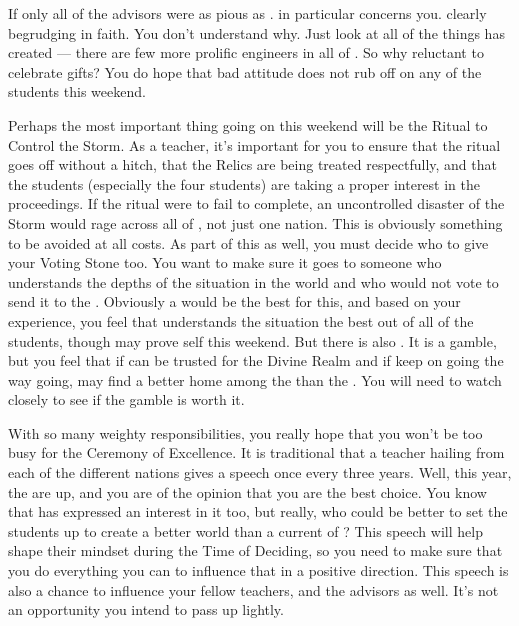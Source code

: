 \documentclass[char]{GL2020}
\begin{document}
If only all of the advisors were as pious as \cEbbPriest{}. \cBunker{\full} in particular concerns you. \cBunker{\They} \cBunker{\are} clearly begrudging in \cBunker{\their} faith. You don't understand why. Just look at all of the things \cBunker{} has created — there are few more prolific engineers in all of \pEarth{}. So why \cBunker{\are} \cBunker{\they} reluctant to celebrate \cBunker{\their} gifts? You do hope that \cBunker{\their} bad attitude does not rub off on any of the students this weekend.

Perhaps the most important thing going on this weekend will be the Ritual to Control the Storm. As a teacher, it's important for you to ensure that the ritual goes off without a hitch, that the Relics are being treated respectfully, and that the students (especially the four \pShip{} students) are taking a proper interest in the proceedings. If the ritual were to fail to complete, an uncontrolled disaster of the Storm would rage across all of \pEarth{}, not just one nation. This is obviously something to be avoided at all costs. As part of this as well, you must decide who to give your Voting Stone too. You want to make sure it goes to someone who understands the depths of the situation in the world and who would not vote to send it to the \pShip{}. Obviously a \pShippie{} would be the best for this, and based on your experience, you feel that \cWarlordDaughter{} understands the situation the best out of all of the students, though \cInitiate{} may prove \cInitiate{\them}self this weekend. But there is also \cAmbition{}. It is a gamble, but you feel that if \cAmbition{\they} can be trusted for the Divine Realm and if \cAmbition{\they} keep\cAmbition{\verbs} on going the way \cAmbition{\they} \cAmbition{\are} going, \cAmbition{\they} may find a better home among the \pShippies{} than the \pTech{}. You will need to watch \cAmbition{\them} closely to see if the gamble is worth it.  

With so many weighty responsibilities, you really hope that you won't be too busy for the Ceremony of Excellence. It is traditional that a teacher hailing from each of the different nations gives a speech once every three years. Well, this year, the \pShip{} are up, and you are of the opinion that you are the best choice. You know that \cPirate{} has expressed an interest in it too, but really, who could be better to set the students up to create a better world than a current \cFlowPriest{\cleric} of \cFlowFull{\full}? This speech will help shape their mindset during the Time of Deciding, so you need to make sure that you do everything you can to influence that in a positive direction. This speech is also a chance to influence your fellow teachers, and the advisors as well. It's not an opportunity you intend to pass up lightly.
\end{document}
